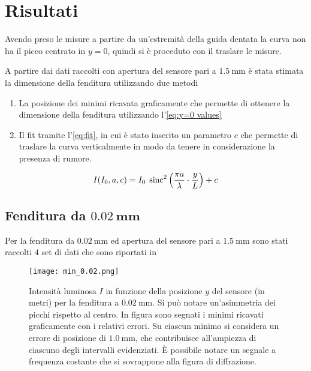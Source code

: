 \documentclass[../main.tex]{subfiles}
\begin{document}
\section{Risultati}

Avendo preso le misure a partire da un'estremità della guida dentata la curva non ha il picco centrato in $y = 0$, quindi si è proceduto con il traslare le misure.

A partire dai dati raccolti con apertura del sensore pari a $\qty{1.5}{\mm}$ 
è stata stimata la dimensione della fenditura utilizzando due metodi

\begin{enumerate}
    \item La posizione dei minimi ricavata graficamente che permette di ottenere la dimensione della fenditura utilizzando l'\autoref{eq:y=0 values}
    \item Il fit tramite l'\autoref{eq:fit}, in cui è stato inserito un parametro $c$ che permette di traslare la curva verticalmente in modo da tenere in considerazione la presenza di rumore.
\end{enumerate}

\begin{equation} \label{eq:fit}
    I(I_{0}, a, c) = I_{0} \; \operatorname{sinc}^{2} \left( \frac{\pi a}{\lambda} \cdot \frac{y}{L} \right) + c
\end{equation}

\subsection{Fenditura da $\mathbf{\qty{0.02}{\mm}}$}

Per la fenditura da $\qty{0.02}{\mm}$ ed apertura del sensore pari a $\qty{1.5}{\mm}$ sono stati raccolti $4$ set di dati che sono riportati in %

\begin{figure}[ht!]
    \centering
    \texttt{[image: min\_0.02.png]}
    \caption{Intensità luminosa $I$ in funzione della posizione $y$ del sensore (in metri) per la fenditura a $\qty{0.02}{\milli\metre}$. Si può notare un'asimmetria dei picchi  rispetto al centro. In figura sono segnati i minimi ricavati graficamente con i relativi errori. Su ciascun minimo si considera un errore di posizione di $\qty{1.0}{\mm}$, che contribuisce all'ampiezza di ciascuno degli intervalli evidenziati. È possibile notare un segnale a frequenza costante che si sovrappone alla figura di diffrazione.} %
    \label{fig:minimi 0.02}
\end{figure}
\end{document}

